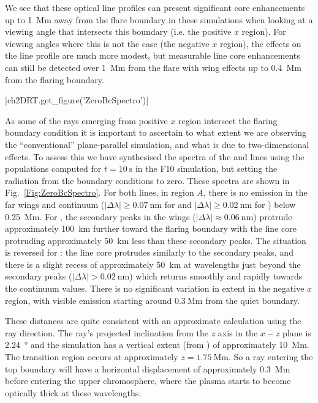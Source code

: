 We see that these optical line profiles can present significant core enhancements up to \SI{1}{\mega\metre} away from the flare boundary in these simulations when looking at a viewing angle that intersects this boundary (i.e. the positive $x$ region).
For viewing angles where this is not the case (the negative $x$ region), the effects on the line profile are much more modest, but measurable line core enhancements can still be detected over \SI{1}{\mega\metre} from the flare with wing effects up to \SI{0.4}{\mega\metre} from the flaring boundary.

\py[2DRT]|ch2DRT.get_figure('ZeroBcSpectro')|

As some of the rays emerging from positive $x$ region intersect the flaring boundary condition it is important to ascertain to what extent we are observing the ``conventional'' plane-parallel simulation, and what is due to two-dimensional effects.
To assess this we have synthesised the spectra of the \Ha{} and \CaLine{} lines using the populations computed for $t=\SI{10}{\second}$ in the F10 simulation, but setting the radiation from the boundary conditions to zero.
These spectra are shown in Fig.~\ref{Fig:ZeroBcSpectro}.
For both lines, in region $A$, there is no emission in the far wings and continuum ($|\Delta\lambda|\ge\SI{0.07}{\nano\metre}$ for \Ha{} and $|\Delta\lambda|\ge\SI{0.02}{\nano\metre}$ for \CaLine{}) below \SI{0.25}{\mega\metre}.
For \Ha{}, the secondary peaks in the wings ($|\Delta\lambda|\approx\SI{0.06}{\nano\metre}$) protrude approximately \SI{100}{\kilo\metre} further toward the flaring boundary with the line core protruding approximately \SI{50}{\kilo\metre} less than these secondary peaks.
The situation is reversed for \CaLine{}: the line core protrudes similarly to the secondary \Ha{} peaks, and there is a slight recess of approximately \SI{50}{\kilo\metre} at wavelengths just beyond the secondary peaks ($|\Delta\lambda| > \SI{0.02}{\nano\metre}$) which returns smoothly and rapidly towards the continuum values.
There is no significant variation in extent in the negative $x$ region, with visible emission starting around $\SI{0.3}{\mega\metre}$ from the quiet boundary.

These distances are quite consistent with an approximate calculation using the ray direction.
The ray's projected inclination from the $z$ axis in the $x-z$ plane is \SI{2.24}{\degree} and the simulation has a vertical extent (from \Radyn{}) of approximately \SI{10}{\mega\metre}.
The transition region occurs at approximately $z=\SI{1.75}{\mega\metre}$.
So a ray entering the top boundary will have a horizontal displacement of approximately \SI{0.3}{\mega\metre} before entering the upper chromosphere, where the plasma starts to become optically thick at these wavelengths.

